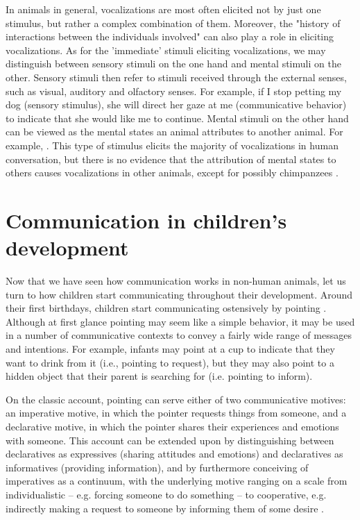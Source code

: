In animals in general, vocalizations are most often elicited not by just one stimulus, but rather a complex combination of them. Moreover, the "history of interactions between the individuals involved" \citep[p.~151]{SeyfarthCheney03} can also play a role in eliciting vocalizations. As for the 'immediate' stimuli eliciting vocalizations, we may distinguish between sensory stimuli on the one hand and mental stimuli on the other. Sensory stimuli then refer to stimuli received through the external senses, such as visual, auditory and olfactory senses.
For example, if I stop petting my dog (sensory stimulus), she will direct her gaze at me (communicative behavior) to indicate that she would like me to continue.
Mental stimuli on the other hand can be viewed as the mental states an animal attributes to another animal.
For example, .
This type of stimulus elicits the majority of vocalizations in human conversation, but there is no evidence that the attribution of mental states to others causes vocalizations in other animals, except for possibly chimpanzees \citep{SeyfarthCheney03}.

\section{Communication in children's development}
\label{sec:comm:ontogeny}


Now that we have seen how communication works in non-human animals, let us turn to how children start communicating throughout their development.
Around their first birthdays, children start communicating ostensively by pointing \citep{Tomasello08-origins}. Although at first glance pointing may seem like a simple behavior, it may be used in a number of communicative contexts to convey a fairly wide range of messages and intentions.
For example, infants may point at a cup to indicate that they want to drink from it (i.e., pointing to request), but they may also point to a hidden object that their parent is searching for (i.e. pointing to inform).

On the classic account, pointing can serve either of two communicative motives: an imperative motive, in which the pointer requests things from someone, and a declarative motive, in which the pointer shares their experiences and emotions with someone.
This account can be extended upon by distinguishing between declaratives as expressives (sharing attitudes and emotions) and declaratives as informatives (providing information), and by furthermore conceiving of imperatives as a continuum, with the underlying motive ranging on a scale from individualistic -- e.g. forcing someone to do something -- to cooperative, e.g. indirectly making a request to someone by informing them of some desire \citep{Tomasello08-origins}.

